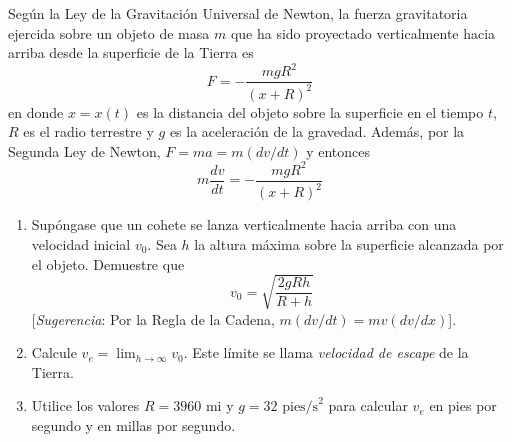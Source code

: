 \item Según la Ley de la Gravitación Universal de Newton, la fuerza gravitatoria ejercida sobre un objeto de masa $m$ que ha sido proyectado verticalmente hacia arriba desde la superficie de la Tierra es
$$F = - \frac{mgR^2}{(x + R)^2}$$
en donde $x = x(t)$ es la distancia del objeto sobre la superficie en el tiempo $t$, $R$ es el radio terrestre y $g$ es la aceleración de la gravedad. Además, por la Segunda Ley de Newton, $F = ma = m(dv/dt)$ y entonces
$$m \frac{dv}{dt} = - \frac{mgR^2}{(x + R)^2}$$
\begin{enumerate}
    \item[(a)] Supóngase que un cohete se lanza verticalmente hacia arriba con una velocidad inicial $v_0$. Sea $h$ la altura máxima sobre la superficie alcanzada por el objeto. Demuestre que
    $$v_0 = \sqrt{\frac{2gRh}{R + h}}$$
    [\textit{Sugerencia}: Por la Regla de la Cadena, $m(dv/dt) = mv(dv/dx)$].
    \item[(b)] Calcule $v_e = \lim_{h \to \infty} v_0$. Este límite se llama \textit{velocidad de escape} de la Tierra.
    \item[(c)] Utilice los valores $R = 3960 \text{ mi}$ y $g = 32 \text{ pies/s}^2$ para calcular $v_e$ en pies por segundo y en millas por segundo.
\end{enumerate}
